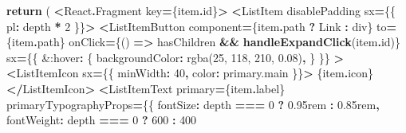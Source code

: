 \documentclass[
]{article}
\newenvironment{Shaded}{\begin{snugshade}}{\end{snugshade}}
\newcommand{\AttributeTok}[1]{\textcolor[rgb]{0.13,0.29,0.53}{#1}}
\newcommand{\ControlFlowTok}[1]{\textcolor[rgb]{0.13,0.29,0.53}{\textbf{#1}}}
\newcommand{\DecValTok}[1]{\textcolor[rgb]{0.00,0.00,0.81}{#1}}
\newcommand{\FunctionTok}[1]{\textcolor[rgb]{0.13,0.29,0.53}{\textbf{#1}}}
\newcommand{\KeywordTok}[1]{\textcolor[rgb]{0.13,0.29,0.53}{\textbf{#1}}}
\newcommand{\NormalTok}[1]{#1}
\newcommand{\OperatorTok}[1]{\textcolor[rgb]{0.81,0.36,0.00}{\textbf{#1}}}
\newcommand{\StringTok}[1]{\textcolor[rgb]{0.31,0.60,0.02}{#1}}
\begin{document}
\begin{Shaded}
\begin{Highlighting}[]
    \ControlFlowTok{return}\NormalTok{ (}
      \OperatorTok{\textless{}}\NormalTok{React}\OperatorTok{.}\AttributeTok{Fragment}\NormalTok{ key}\OperatorTok{=}\NormalTok{\{item}\OperatorTok{.}\AttributeTok{id}\NormalTok{\}}\OperatorTok{\textgreater{}}
        \OperatorTok{\textless{}}\NormalTok{ListItem disablePadding sx}\OperatorTok{=}\NormalTok{\{\{ pl}\OperatorTok{:}\NormalTok{ depth }\OperatorTok{*} \DecValTok{2}\NormalTok{ \}\}}\OperatorTok{\textgreater{}}
          \OperatorTok{\textless{}}\NormalTok{ListItemButton}
\NormalTok{            component}\OperatorTok{=}\NormalTok{\{item}\OperatorTok{.}\AttributeTok{path} \OperatorTok{?}\NormalTok{ Link }\OperatorTok{:} \StringTok{\textquotesingle{}div\textquotesingle{}}\NormalTok{\}}
\NormalTok{            to}\OperatorTok{=}\NormalTok{\{item}\OperatorTok{.}\AttributeTok{path}\NormalTok{\}}
\NormalTok{            onClick}\OperatorTok{=}\NormalTok{\{() }\KeywordTok{=\textgreater{}}\NormalTok{ hasChildren }\OperatorTok{\&\&} \FunctionTok{handleExpandClick}\NormalTok{(item}\OperatorTok{.}\AttributeTok{id}\NormalTok{)\}}
\NormalTok{            sx}\OperatorTok{=}\NormalTok{\{\{}
              \StringTok{\textquotesingle{}\&:hover\textquotesingle{}}\OperatorTok{:}\NormalTok{ \{}
\NormalTok{                backgroundColor}\OperatorTok{:} \StringTok{\textquotesingle{}rgba(25, 118, 210, 0.08)\textquotesingle{}}\OperatorTok{,}
\NormalTok{              \}}
\NormalTok{            \}\}}
          \OperatorTok{\textgreater{}}
            \OperatorTok{\textless{}}\NormalTok{ListItemIcon sx}\OperatorTok{=}\NormalTok{\{\{ minWidth}\OperatorTok{:} \DecValTok{40}\OperatorTok{,}\NormalTok{ color}\OperatorTok{:} \StringTok{\textquotesingle{}primary.main\textquotesingle{}}\NormalTok{ \}\}}\OperatorTok{\textgreater{}}
\NormalTok{              \{item}\OperatorTok{.}\AttributeTok{icon}\NormalTok{\}}
            \OperatorTok{\textless{}/}\NormalTok{ListItemIcon}\OperatorTok{\textgreater{}}
            \OperatorTok{\textless{}}\NormalTok{ListItemText}
\NormalTok{              primary}\OperatorTok{=}\NormalTok{\{item}\OperatorTok{.}\AttributeTok{label}\NormalTok{\}}
\NormalTok{              primaryTypographyProps}\OperatorTok{=}\NormalTok{\{\{}
\NormalTok{                fontSize}\OperatorTok{:}\NormalTok{ depth }\OperatorTok{===} \DecValTok{0} \OperatorTok{?} \StringTok{\textquotesingle{}0.95rem\textquotesingle{}} \OperatorTok{:} \StringTok{\textquotesingle{}0.85rem\textquotesingle{}}\OperatorTok{,}
\NormalTok{                fontWeight}\OperatorTok{:}\NormalTok{ depth }\OperatorTok{===} \DecValTok{0} \OperatorTok{?} \DecValTok{600} \OperatorTok{:} \DecValTok{400}

\end{Highlighting}
\end{Shaded}
\end{document}
